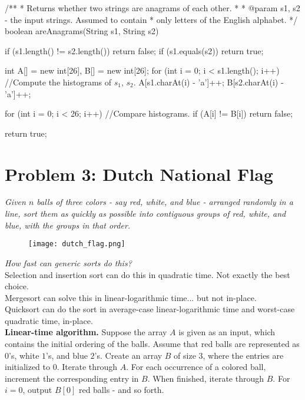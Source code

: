 \begin{java}
    /**
     * Returns whether two strings are anagrams of each other.
     *
     * @param s1, s2 - the input strings. Assumed to contain
     *                 only letters of the English alphabet.
     */
    boolean areAnagrams(String s1, String s2) {
        if (s1.length() != s2.length()) {
            return false;
        }
        if (s1.equals(s2)) {
            return true;
        }

        int A[] = new int[26], B[] = new int[26];
        for (int i = 0; i < s1.length(); i++) { //Compute the histograms of $s_1$, $s_2$.
            A[s1.charAt(i) - 'a']++;
            B[s2.charAt(i) - 'a']++;
        }

        for (int i = 0; i < 26; i++) {          //Compare histograms.
            if (A[i] != B[i]) {
                return false;
            }
        }

        return true;
    }
\end{java}
\section*{Problem 3: Dutch National Flag}

\textit{Given $n$ balls of three colors - say red, white, and blue - arranged randomly in a line, sort them as quickly as possible into contiguous groups of red, white, and blue, with the groups in that order.}\\

\begin{figure}[h]
    \centering
    \texttt{[image: dutch\_flag.png]}
\end{figure}

\textit{How fast can generic sorts do this?}\\

Selection and insertion sort can do this in quadratic time. Not exactly the best choice.\\

Mergesort can solve this in linear-logarithmic time... but not in-place.\\

Quicksort can do the sort in average-case linear-logarithmic time and worst-case quadratic time, in-place.\\

\textbf{Linear-time algorithm.} Suppose the array $A$ is given as an input, which contains the initial ordering of the balls. Assume that red balls are represented as $0$'s, white $1$'s, and blue $2$'s. Create an array $B$ of size $3$, where the entries are initialized to $0$. Iterate through $A$. For each occurrence of a colored ball, increment the corresponding entry in $B$. When finished, iterate through $B$. For $i=0$, output $B[0]$ red balls - and so forth.\\

